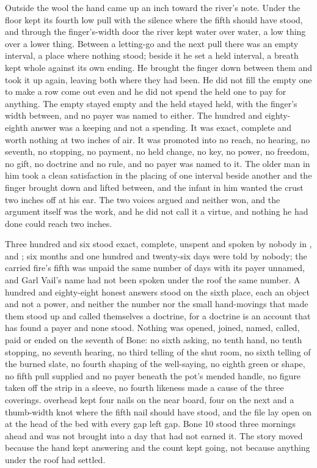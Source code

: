 Outside the wool the hand came up an inch toward the river's note. Under the floor  kept its fourth low pull with the silence where the fifth should have stood, and through the finger's-width door the river kept water over water, a low thing over a lower thing. Between a letting-go and the next pull there was an empty interval, a place where nothing stood; beside it he set a held interval, a breath kept whole against its own ending. He brought the finger down between them and took it up again, leaving both where they had been. He did not fill the empty one to make a row come out even and he did not spend the held one to pay for anything. The empty stayed empty and the held stayed held, with the finger's width between, and no payer was named to either. The hundred and eighty-eighth answer was a keeping and not a spending. It was exact, complete and worth nothing at two inches of air. It was promoted into no reach, no hearing, no seventh, no stopping, no payment, no held change, no key, no power, no freedom, no gift, no doctrine and no rule, and no payer was named to it. The older man in him took a clean satisfaction in the placing of one interval beside another and the finger brought down and lifted between, and the infant in him wanted the crust two inches off at his ear. The two voices argued and neither won, and the argument itself was the work, and he did not call it a virtue, and nothing he had done could reach two inches.

Three hundred and six stood exact, complete, unspent and spoken by nobody in ,  and ; six months and one hundred and twenty-six days were told by nobody; the carried fire's fifth was unpaid the same number of days with its payer unnamed, and Garl Vail's name had not been spoken under the roof the same number. A hundred and eighty-eight honest answers stood on the sixth place, each an object and not a power, and neither the number nor the small hand-movings that made them stood up and called themselves a doctrine, for a doctrine is an account that has found a payer and none stood. Nothing was opened, joined, named, called, paid or ended on the seventh of Bone: no sixth asking, no tenth hand, no tenth stopping, no seventh hearing, no third telling of the shut room, no sixth telling of the burned slate, no fourth shaping of the well-saying, no eighth green or shape, no fifth pull supplied and no payer beneath the pot's mended handle, no figure taken off the strip in a sleeve, no fourth likeness made a cause of the three coverings.  overhead kept four nails on the near board, four on the next and a thumb-width knot where the fifth nail should have stood, and the file lay open on  at the head of the bed with every gap left gap. Bone 10 stood three mornings ahead and was not brought into a day that had not earned it. The story moved because the hand kept answering and the count kept going, not because anything under the roof had settled.

